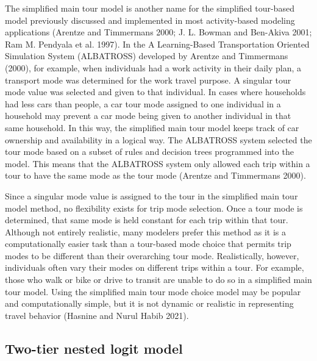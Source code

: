 \documentclass[12pt, oneside, openright]{byuthesis}
\begin{document}
The simplified main tour model is another name for the simplified tour-based model previously discussed and implemented in most activity-based modeling applications (Arentze and Timmermans 2000; J. L. Bowman and Ben-Akiva 2001; Ram M. Pendyala et al. 1997). In the A Learning-Based Transportation Oriented Simulation System (ALBATROSS) developed by Arentze and Timmermans (2000), for example, when individuals had a work activity in their daily plan, a transport mode was determined for the work travel purpose. A singular tour mode value was selected and given to that individual. In cases where households had less cars than people, a car tour mode assigned to one individual in a household may prevent a car mode being given to another individual in that same household. In this way, the simplified main tour model keeps track of car ownership and availability in a logical way. The ALBATROSS system selected the tour mode based on a subset of rules and decision trees programmed into the model. This means that the ALBATROSS system only allowed each trip within a tour to have the same mode as the tour mode (Arentze and Timmermans 2000).

Since a singular mode value is assigned to the tour in the simplified main tour model method, no flexibility exists for trip mode selection. Once a tour mode is determined, that same mode is held constant for each trip within that tour. Although not entirely realistic, many modelers prefer this method as it is a computationally easier task than a tour-based mode choice that permits trip modes to be different than their overarching tour mode. Realistically, however, individuals often vary their modes on different trips within a tour. For example, those who walk or bike or drive to transit are unable to do so in a simplified main tour model. Using the simplified main tour mode choice model may be popular and computationally simple, but it is not dynamic or realistic in representing travel behavior (Hasnine and Nurul Habib 2021).

\hypertarget{lit32}{%
\subsection{Two-tier nested logit model}\label{lit32}}
\end{document}
